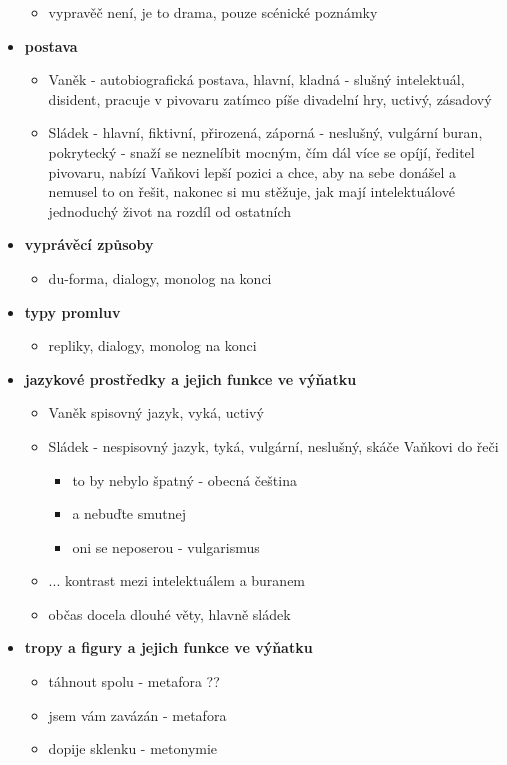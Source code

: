 \documentclass[11pt]{article}
\begin{document}
\begin{itemize}
        \begin{itemize}
            \item vypravěč není, je to drama, pouze scénické poznámky
        \end{itemize}
        \item\textbf{postava}
        \begin{itemize}
            \item Vaněk - autobiografická postava, hlavní, kladná - slušný intelektuál, disident, pracuje v pivovaru zatímco píše divadelní hry, uctivý, zásadový
            \item Sládek - hlavní, fiktivní, přirozená, záporná - neslušný, vulgární buran, pokrytecký - snaží se neznelíbit mocným, čím dál více se opíjí, ředitel pivovaru, nabízí Vaňkovi lepší pozici a chce, aby na sebe donášel a nemusel to on řešit, nakonec si mu stěžuje, jak mají intelektuálové jednoduchý život na rozdíl od ostatních
        \end{itemize}
        \item\textbf{vyprávěcí způsoby}
        \begin{itemize}
            \item du-forma, dialogy, monolog na konci
        \end{itemize}
        \item\textbf{typy promluv}
        \begin{itemize}
            \item repliky, dialogy, monolog na konci
        \end{itemize}
        \item\textbf{jazykové prostředky a jejich funkce ve výňatku}
        \begin{itemize}
            \item Vaněk spisovný jazyk, vyká, uctivý
            \item Sládek - nespisovný jazyk, tyká, vulgární, neslušný, skáče Vaňkovi do řeči
            \begin{itemize}
                \item to by nebylo špatný - obecná čeština
                \item a nebuďte smutnej
                \item oni se neposerou - vulgarismus
            \end{itemize}
            \item ... kontrast mezi intelektuálem a buranem
            \item občas docela dlouhé věty, hlavně sládek
        \end{itemize}
        \item\textbf{tropy a figury a jejich funkce ve výňatku}
        \begin{itemize}
            \item táhnout spolu - metafora ??
            \item jsem vám zavázán - metafora
            \item dopije sklenku - metonymie
        \end{itemize}
    \end{itemize}
\end{document}
